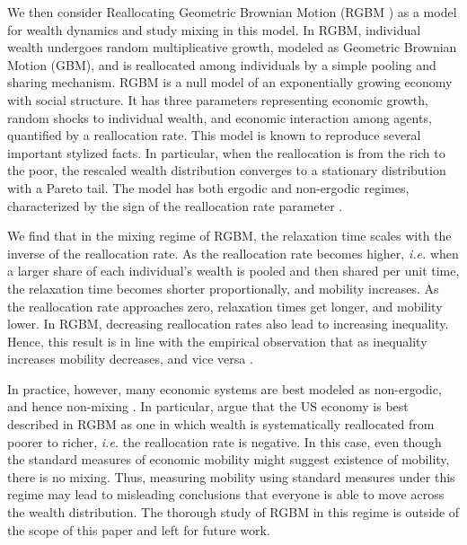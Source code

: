 \documentclass[11pt]{article}
\newcommand{\ie}{{\it i.e.}\xspace}
\numberwithin{equation}{section}
\begin{document}
We then consider Reallocating Geometric Brownian Motion (RGBM \citep{MarsiliMaslovZhang1998,LiuSerota2017,BermanPetersAdamou2019}) as a model for wealth dynamics and study mixing in this model. In RGBM, individual wealth undergoes random multiplicative growth, modeled as Geometric Brownian Motion (GBM), and is reallocated among individuals by a simple pooling and sharing mechanism. RGBM is a null model of an exponentially growing economy with social structure. It has three parameters representing economic growth, random shocks to individual wealth, and economic interaction among agents, quantified by a reallocation rate. This model is known to reproduce several important stylized facts. In particular, when the reallocation is from the rich to the poor, the rescaled wealth distribution converges to a stationary distribution with a Pareto tail. The model has both ergodic and non-ergodic regimes, characterized by the sign of the reallocation rate parameter \citep{BermanPetersAdamou2019}.

We find that in the mixing regime of RGBM, the relaxation time scales with the inverse of the reallocation rate. As the reallocation rate becomes higher, \ie when a larger share of each individual's wealth is pooled and then shared per unit time, the relaxation time becomes shorter proportionally, and mobility increases. As the reallocation rate approaches zero, relaxation times get longer, and mobility lower. In RGBM, decreasing reallocation rates also lead to increasing inequality. Hence, this result is in line with the empirical observation that as inequality increases mobility decreases, and vice versa \citep{corak2013}. %

In practice, however, many economic systems are best modeled as non-ergodic, and hence non-mixing \citep{Peters2019b}. In particular, \citet{BermanPetersAdamou2019} argue that the US economy is best described in RGBM as one in which wealth is systematically reallocated from poorer to richer, \ie the reallocation rate is negative. In this case, even though the standard measures of economic mobility might suggest existence of mobility, there is no mixing. Thus, measuring mobility using standard measures under this regime may lead to misleading conclusions that everyone is able to move across the wealth distribution. The thorough study of RGBM in this regime is outside of the scope of this paper and left for future work.
\end{document}
